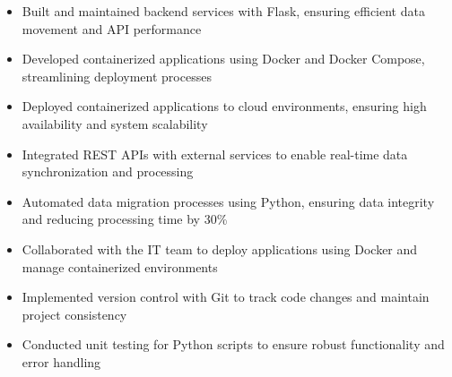 \par\bigskip
{}
\par\smallskip
\begin{minipage}{13.75cm}
  \begin{minipage}{6.5cm}
    \begin{itemize}
      \item Built and maintained backend services with Flask, ensuring efficient data movement and API performance
      \item Developed containerized applications using Docker and Docker Compose, streamlining deployment processes
    \end{itemize}
  \end{minipage}
  \hfill
  \begin{minipage}{6.5cm}
    \begin{itemize}
      \item Deployed containerized applications to cloud environments, ensuring high availability and system scalability
      \item Integrated REST APIs with external services to enable real-time data synchronization and processing
    \end{itemize}
  \end{minipage}
\end{minipage}
\par\smallskip
\divider

\par\smallskip
\begin{minipage}{13.75cm}
  \begin{minipage}{6.5cm}
    \begin{itemize}
      \item Automated data migration processes using Python, ensuring data integrity and reducing processing time by 30\%
      \item Collaborated with the IT team to deploy applications using Docker and manage containerized environments
    \end{itemize}
  \end{minipage}
  \hfill
  \begin{minipage}{6.5cm}
    \begin{itemize}
      \item Implemented version control with Git to track code changes and maintain project consistency
      \item Conducted unit testing for Python scripts to ensure robust functionality and error handling
    \end{itemize}
  \end{minipage}
\end{minipage}

